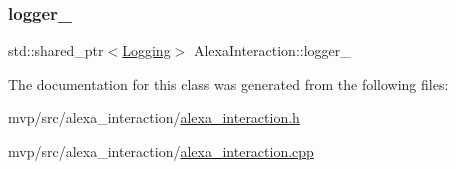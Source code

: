 \mbox{\label{classAlexaInteraction_adeb8bad9e21b64718a64333e879dd4fa}} 
\subsubsection{\texorpdfstring{logger\+\_\+}{logger\_}}
{\footnotesize\ttfamily std\+::shared\+\_\+ptr$<$\hyperlink{classLogging}{Logging}$>$ Alexa\+Interaction\+::logger\+\_\+\hspace{0.3cm}{\ttfamily [private]}}



The documentation for this class was generated from the following files\+:\begin{DoxyCompactItemize}
\item 
mvp/src/alexa\+\_\+interaction/\hyperlink{alexa__interaction_8h}{alexa\+\_\+interaction.\+h}\item 
mvp/src/alexa\+\_\+interaction/\hyperlink{alexa__interaction_8cpp}{alexa\+\_\+interaction.\+cpp}\end{DoxyCompactItemize}
